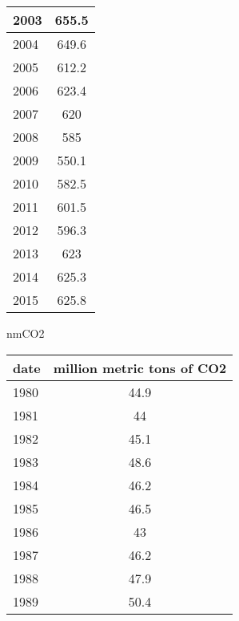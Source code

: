 \documentclass{mcmthesis}
\begin{document}
\begin{appendices}
\begin{minipage}{\textwidth}
\begin{minipage}[t]{0.45\textwidth}
\begin{tabular}{|l|c|}
        2003 & 655.5                      \\ \hline
        2004 & 649.6                      \\ \hline
        2005 & 612.2                      \\ \hline
        2006 & 623.4                      \\ \hline
        2007 & 620                        \\ \hline
        2008 & 585                        \\ \hline
        2009 & 550.1                      \\ \hline
        2010 & 582.5                      \\ \hline
        2011 & 601.5                      \\ \hline
        2012 & 596.3                      \\ \hline
        2013 & 623                        \\ \hline
        2014 & 625.3                      \\ \hline
        2015 & 625.8                      \\ \hline
        \end{tabular}
    \end{minipage}
    \begin{minipage}[t]{0.45\textwidth}
    \centering
          \makeatletter{}\makeatother\caption{nmCO2}
          \begin{tabular}{|l|c|}
            \hline
            date & million metric tons of CO2 \\ \hline
            1980 & 44.9                       \\ \hline
            1981 & 44                         \\ \hline
            1982 & 45.1                       \\ \hline
            1983 & 48.6                       \\ \hline
            1984 & 46.2                       \\ \hline
            1985 & 46.5                       \\ \hline
            1986 & 43                         \\ \hline
            1987 & 46.2                       \\ \hline
            1988 & 47.9                       \\ \hline
            1989 & 50.4                       \\ \hline

\end{tabular}
\end{minipage}
\end{minipage}
\end{appendices}
\end{document}
